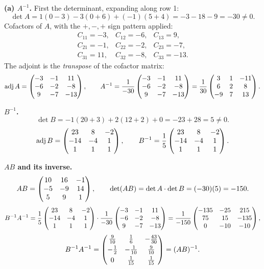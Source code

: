 \begin{solution}
\textbf{(a) $A^{-1}$.} First the determinant, expanding along row 1:
\[
\det A=1(0-3)-3(0+6)+(-1)(5+4)=-3-18-9=-30 \neq 0 .
\]
Cofactors of $A$, with the $+,-,+$ sign pattern applied:
\[
\begin{array}{lll}
C_{11}=-3, & C_{12}=-6, & C_{13}=9,\\
C_{21}=-1, & C_{22}=-2, & C_{23}=-7,\\
C_{31}=11, & C_{32}=-8, & C_{33}=-13 .
\end{array}
\]
The adjoint is the \emph{transpose} of the cofactor matrix:
\[
\operatorname{adj}A=\begin{pmatrix}-3&-1&11\\-6&-2&-8\\9&-7&-13\end{pmatrix},
\qquad
A^{-1}=\frac{1}{-30}\begin{pmatrix}-3&-1&11\\-6&-2&-8\\9&-7&-13\end{pmatrix}
=\frac{1}{30}\begin{pmatrix}3&1&-11\\6&2&8\\-9&7&13\end{pmatrix}.
\]

\medskip
\textbf{$B^{-1}$.}
\[
\det B=-1(20+3)+2(12+2)+0=-23+28=5\neq 0 .
\]
\[
\operatorname{adj}B=\begin{pmatrix}23&8&-2\\-14&-4&1\\1&1&1\end{pmatrix},
\qquad
B^{-1}=\frac{1}{5}\begin{pmatrix}23&8&-2\\-14&-4&1\\1&1&1\end{pmatrix}.
\]

\medskip
\textbf{$AB$ and its inverse.}
\[
AB=\begin{pmatrix}10&16&-1\\-5&-9&14\\5&9&1\end{pmatrix},\qquad
\det(AB)=\det A\cdot\det B=(-30)(5)=-150 .
\]
\[
B^{-1}A^{-1}=\frac{1}{5}\begin{pmatrix}23&8&-2\\-14&-4&1\\1&1&1\end{pmatrix}\cdot
\frac{1}{-30}\begin{pmatrix}-3&-1&11\\-6&-2&-8\\9&-7&-13\end{pmatrix}
=\frac{1}{-150}\begin{pmatrix}-135&-25&215\\75&15&-135\\0&-10&-10\end{pmatrix},
\]
\[
B^{-1}A^{-1}=\begin{pmatrix}\tfrac{9}{10}&\tfrac16&-\tfrac{43}{30}\\[3pt]
-\tfrac12&-\tfrac1{10}&\tfrac{9}{10}\\[3pt]
0&\tfrac1{15}&\tfrac1{15}\end{pmatrix}=(AB)^{-1}.
\]


\end{solution}
